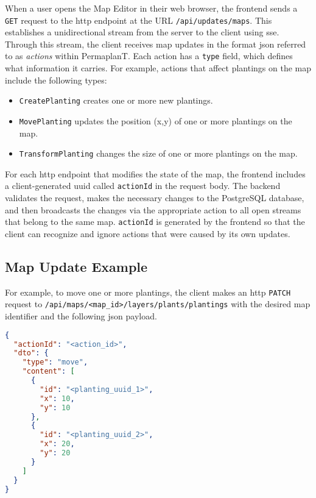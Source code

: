 \documentclass[final,oneside]{vutinfth}
\newcommand{\urlsnippet}[1]{\lstinline[language=url]{#1}}
\begin{document}
When a user opens the Map Editor in their web browser, the frontend sends a \texttt{GET} request to the \gls{http} endpoint at the URL \urlsnippet{/api/updates/maps}.
This establishes a unidirectional stream from the server to the client using \gls{sse}.
Through this stream, the client receives map updates in the format \gls{json} referred to as \emph{actions} within PermaplanT.
Each action has a \texttt{type} field, which defines what information it carries.
For example, actions that affect plantings on the map include the following types:
\begin{itemize}
    \item \texttt{CreatePlanting} creates one or more new plantings.
    \item \texttt{MovePlanting} updates the position (x,y) of one or more plantings on the map.
    \item\texttt{TransformPlanting} changes the size of one or more plantings on the map.
\end{itemize}

For each \gls{http} endpoint that modifies the state of the map, the frontend includes a client-generated \gls{uuid} called \texttt{actionId} in the request body.
The backend validates the request, makes the necessary changes to the PostgreSQL database, and then broadcasts the changes via the appropriate action to all open streams that belong to the same map.
\texttt{actionId} is generated by the frontend so that the client can recognize and ignore actions that were caused by its own updates.

\subsection{Map Update Example}

For example, to move one or more plantings, the client makes an \gls{http} \texttt{PATCH} request to \urlsnippet{/api/maps/<map_id>/layers/plants/plantings} with the desired map identifier and the following \gls{json} payload.

\begin{minipage}{\linewidth}
\begin{lstlisting}[language=json]
{
  "actionId": "<action_id>",
  "dto": {
    "type": "move",
    "content": [
      {
        "id": "<planting_uuid_1>",
        "x": 10,
        "y": 10
      },
      {
        "id": "<planting_uuid_2>",
        "x": 20,
        "y": 20
      }
    ]
  }
}
\end{lstlisting}
\end{minipage}
\end{document}
